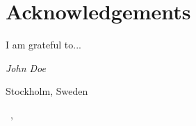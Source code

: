 \chapter*{Acknowledgements}
I am grateful to...

\vspace{0.5cm}

\begin{flushright}
\noindent \emph{John Doe}

Stockholm, Sweden

\monthname\ \number\day, \number\year
\end{flushright}
